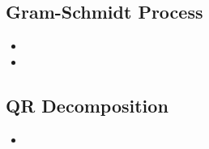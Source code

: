 \begin{itemize}
  \subsection{Gram-Schmidt Process}\label{Gram-Schmidt Process}
  \begin{itemize}
    \item {}
    \item {}
  \end{itemize}

  \subsection{QR Decomposition}\label{QR Decomposition}
  \begin{itemize}
    \item 
  \end{itemize}
  
  
\end{itemize}
